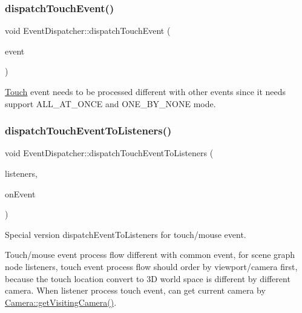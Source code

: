 \subsubsection{\texorpdfstring{dispatch\+Touch\+Event()}{dispatchTouchEvent()}\hspace{0.1cm}{\footnotesize\ttfamily [2/2]}}
{\footnotesize\ttfamily void Event\+Dispatcher\+::dispatch\+Touch\+Event (\begin{DoxyParamCaption}\item[{\hyperlink{classEventTouch}{Event\+Touch} $\ast$}]{event }\end{DoxyParamCaption})\hspace{0.3cm}{\ttfamily [protected]}}

\hyperlink{classTouch}{Touch} event needs to be processed different with other events since it needs support A\+L\+L\+\_\+\+A\+T\+\_\+\+O\+N\+CE and O\+N\+E\+\_\+\+B\+Y\+\_\+\+N\+O\+NE mode. \mbox{\label{classEventDispatcher_ad49739c7342d1ccf133914414559ecdd}} 
\subsubsection{\texorpdfstring{dispatch\+Touch\+Event\+To\+Listeners()}{dispatchTouchEventToListeners()}\hspace{0.1cm}{\footnotesize\ttfamily [1/2]}}
{\footnotesize\ttfamily void Event\+Dispatcher\+::dispatch\+Touch\+Event\+To\+Listeners (\begin{DoxyParamCaption}\item[{\hyperlink{classEventDispatcher_1_1EventListenerVector}{Event\+Listener\+Vector} $\ast$}]{listeners,  }\item[{const std\+::function$<$ bool(\hyperlink{classEventListener}{Event\+Listener} $\ast$)$>$ \&}]{on\+Event }\end{DoxyParamCaption})\hspace{0.3cm}{\ttfamily [protected]}}

Special version dispatch\+Event\+To\+Listeners for touch/mouse event.

Touch/mouse event process flow different with common event, for scene graph node listeners, touch event process flow should order by viewport/camera first, because the touch location convert to 3D world space is different by different camera. When listener process touch event, can get current camera by \hyperlink{classCamera_a71a044ac0a08723ac89ca69deb460f47}{Camera\+::get\+Visiting\+Camera()}. \mbox{\label{classEventDispatcher_ad49739c7342d1ccf133914414559ecdd}} 
